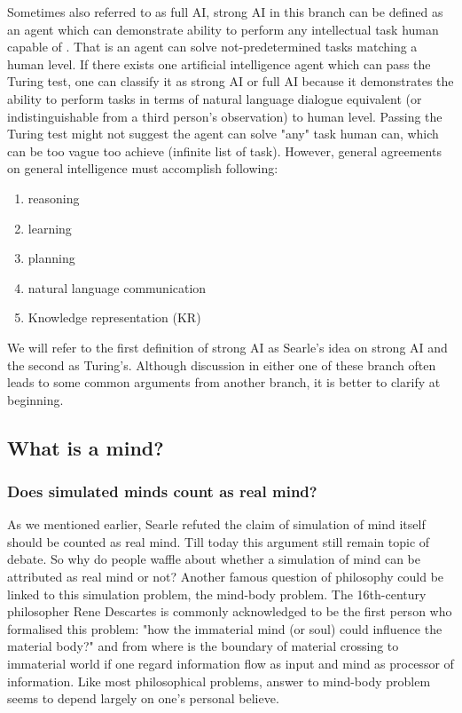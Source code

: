 \documentclass[11pt]{article}
\begin{document}
Sometimes also referred to as full AI, strong AI in this branch can be defined as an agent which can demonstrate ability to perform any intellectual task human capable of \cite{kurzweil2005singularity}. That is an agent can solve not-predetermined tasks matching a human level. If there exists one artificial intelligence agent which can pass the Turing test, one can classify it as strong AI or full AI because it demonstrates the ability to perform tasks in terms of natural language dialogue equivalent (or indistinguishable from a third person's observation) to human level. Passing the Turing test might not suggest the agent can solve "any" task human can, which can be too vague too achieve (infinite list of task). However, general agreements on general intelligence must accomplish following:
\begin{enumerate}
\item reasoning
\item learning
\item planning
\item natural language communication
\item Knowledge representation (KR) 
\end{enumerate}

We will refer to the first definition of strong AI as Searle's idea on strong AI and the second as Turing's. Although discussion in either one of these branch often leads to some common arguments from another branch, it is better to clarify at beginning. 

\subsection{What is a mind?}

\subsubsection*{Does simulated minds count as real mind?}

As we mentioned earlier, Searle refuted the claim of simulation of mind itself should be counted as real mind. Till today this argument still remain topic of debate. So why do people waffle about whether a simulation of mind can be attributed as real mind or not? Another famous question of philosophy could be linked to this simulation problem, the mind-body problem. The 16th-century philosopher Rene Descartes is commonly acknowledged to be the first person who formalised this problem: "how the immaterial mind (or soul) could influence the material body?" and from where is the boundary of material crossing to immaterial world if one regard information flow as input and mind as processor of information. Like most philosophical problems, answer to mind-body problem seems to depend largely on one's personal believe.
\end{document}
